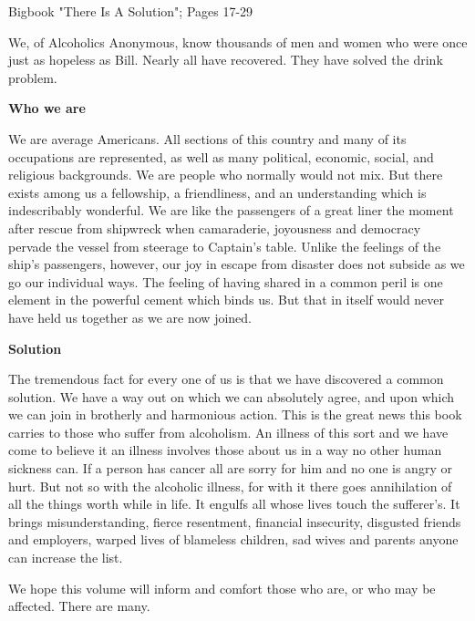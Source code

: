 

Bigbook "There Is A Solution"; Pages 17-29


\begin{biblechapter}

We, of Alcoholics Anonymous, know thousands of men and women who were once just as hopeless as Bill. 
Nearly all have recovered. 
They have solved the drink problem.

\textbf{Who we are}

We are average Americans. 
All sections of this country and many of its occupations are represented, as well as many political, economic, social, and religious backgrounds. 
We are people who normally would not mix. 
But there exists among us a fellowship, a friendliness, and an understanding which is indescribably wonderful. 
We are like the passengers of a great liner the moment after rescue from shipwreck when camaraderie, joyousness and democracy pervade the vessel from steerage to Captain's table. 
Unlike the feelings of the ship's passengers, however, our joy in escape from disaster does not subside as we go our individual ways. 
The feeling of having shared in a common peril is one element in the powerful cement which binds us. 
But that in itself would never have held us together as we are now joined.

\textbf{Solution}

The tremendous fact for every one of us is that we have discovered a common solution. 
We have a way out on which we can absolutely agree, 
and upon which we can join in brotherly and harmonious action. 
This is the great news this book carries to those who suffer from alcoholism. 
An illness of this sort and we have come to believe it an illness involves those about us in a way no other human sickness can. 
If a person has cancer all are sorry for him and no one is angry or hurt. 
But not so with the alcoholic illness, for with it there goes annihilation of all the things worth while in life. 
It engulfs all whose lives touch the sufferer's. 
It brings misunderstanding, fierce resentment, financial insecurity, disgusted friends and employers, 
warped lives of blameless children, sad wives and parents anyone can increase the list.

We hope this volume will inform and comfort those who are, or who may be affected. 
There are many.
\end{biblechapter}


